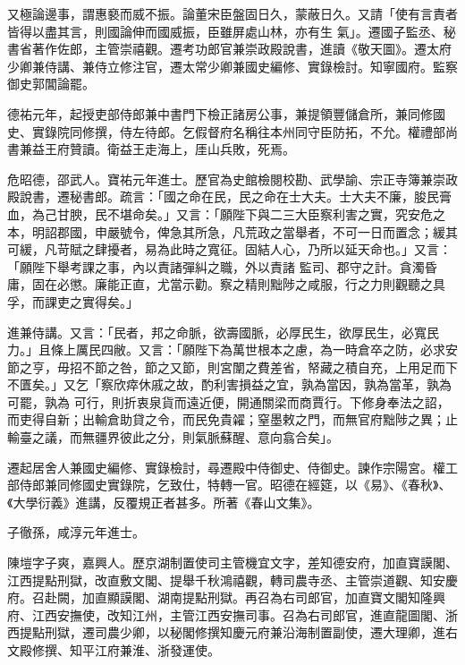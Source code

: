 \begin{pinyinscope}
 又極論邊事，謂惠褻而威不振。論董宋臣盤固日久，蒙蔽日久。又請「使有言責者皆得以盡其言，則國論伸而國威振，臣雖屏處山林，亦有生
 氣」。遷國子監丞、秘書省著作佐郎，主管崇禧觀。遷考功郎官兼崇政殿說書，進讀《敬天圖》。遷太府少卿兼侍講、兼侍立修注官，遷太常少卿兼國史編修、實錄檢討。知寧國府。監察御史郭閶論罷。



 德祐元年，起授吏部侍郎兼中書門下檢正諸房公事，兼提領豐儲倉所，兼同修國史、實錄院同修撰，侍左待郎。乞假督府名稱往本州同守臣防拓，不允。權禮部尚書兼益王府贊讀。衛益王走海上，厓山兵敗，死焉。



 危昭德，邵武人。寶祐元年進士。歷官為史館檢閱校勘、武學諭、宗正寺簿兼崇政殿說書，遷秘書郎。疏言：「國之命在民，民之命在士大夫。士大夫不廉，朘民膏血，為己甘腴，民不堪命矣。」又言：「願陛下與二三大臣察利害之實，究安危之本，明詔郡國，申嚴號令，俾急其所急，凡荒政之當舉者，不可一日而置念；緩其可緩，凡苛賦之肆擾者，易為此時之寬征。固結人心，乃所以延天命也。」又言：「願陛下舉考課之事，內以責諸彈糾之職，外以責諸
 監司、郡守之計。貪濁昏庸，固在必懲。廉能正直，尤當示勸。察之精則黜陟之咸服，行之力則觀聽之具孚，而課吏之實得矣。」



 進兼侍講。又言：「民者，邦之命脈，欲壽國脈，必厚民生，欲厚民生，必寬民力。」且條上厲民四敝。又言：「願陛下為萬世根本之慮，為一時倉卒之防，必求安節之亨，毋招不節之咎，節之又節，則宮闈之費差省，帑藏之積自充，上用足而下不匱矣。」又乞「察欣瘁休戚之故，酌利害損益之宜，孰為當因，孰為當革，孰為可罷，孰為
 可行，則折衷泉貨而遠近便，開通關梁而商賈行。下修身奉法之詔，而吏得自新；出輸倉助貸之令，而民免貴糴；窒墨敕之門，而無官府黜陟之異；止輸臺之議，而無疆界彼此之分，則氣脈蘇醒、意向翕合矣」。



 遷起居舍人兼國史編修、實錄檢討，尋遷殿中侍御史、侍御史。諫作宗陽宮。權工部侍郎兼同修國史實錄院，乞致仕，特轉一官。昭德在經筵，以《易》、《春秋》、《大學衍義》進講，反覆規正者甚多。所著《春山文集》。



 子徹孫，咸淳元年進士。



 陳塏字子爽，嘉興人。歷京湖制置使司主管機宜文字，差知德安府，加直寶謨閣、江西提點刑獄，改直敷文閣、提舉千秋鴻禧觀，轉司農寺丞、主管崇道觀、知安慶府。召赴闕，加直顯謨閣、湖南提點刑獄。再召為右司郎官，加直寶文閣知隆興府、江西安撫使，改知江州，主管江西安撫司事。召為右司郎官，進直龍圖閣、浙西提點刑獄，遷司農少卿，以秘閣修撰知慶元府兼沿海制置副使，遷大理卿，進右文殿修撰、知平江府兼淮、浙發運使。




\end{pinyinscope}
